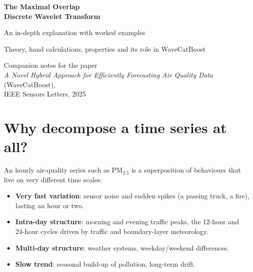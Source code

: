 \documentclass[11pt,a4paper]{article}
\begin{document}
\begin{titlepage}
  \centering
  \vspace*{3cm}
  {\Huge\bfseries The Maximal Overlap\\[0.3em] Discrete Wavelet Transform\par}
  \vspace{0.8cm}
  {\Large An in-depth explanation with worked examples\par}
  \vspace{0.4cm}
  {\large Theory, hand calculations, properties and its role in WaveCatBoost\par}
  \vspace{2cm}
  \vfill
  {\large Companion notes for the paper\\[0.2em]
  \emph{A Novel Hybrid Approach for Efficiently Forecasting Air Quality Data} (WaveCatBoost),\\
  IEEE Sensors Letters, 2025\par}
  \vspace{1cm}
\end{titlepage}

\tableofcontents
\newpage

\section{Why decompose a time series at all?}

An hourly air-quality series such as PM$_{2.5}$ is a superposition of behaviours that live on
very different time scales:

\begin{itemize}[leftmargin=1.5em]
  \item \textbf{Very fast variation}: sensor noise and sudden spikes (a passing truck, a fire), lasting an hour or two.
  \item \textbf{Intra-day structure}: morning and evening traffic peaks, the 12-hour and 24-hour cycles driven by traffic and boundary-layer meteorology.
  \item \textbf{Multi-day structure}: weather systems, weekday/weekend differences.
  \item \textbf{Slow trend}: seasonal build-up of pollution, long-term drift.
\end{itemize}
\end{document}
